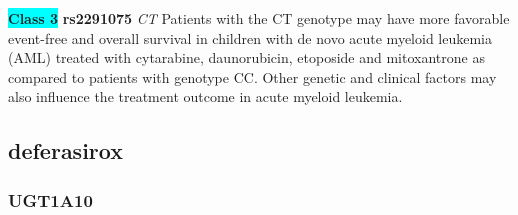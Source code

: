 \documentclass{book}
\begin{document}
\begin{center}
\textbf{\colorbox{cyan} {Class 3}} \textbf{ rs2291075 } \textit{ CT }
Patients with the CT genotype may have more favorable event-free and overall survival in children with de novo acute myeloid leukemia (AML) treated with cytarabine, daunorubicin, etoposide and mitoxantrone as compared to patients with genotype CC. Other genetic and clinical factors may also influence the treatment outcome in acute myeloid leukemia.


\end{center}\subsection{ deferasirox }


\subsubsection{ UGT1A10 }
\end{document}
